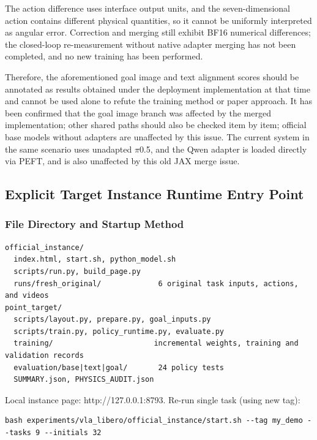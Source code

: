 The action difference uses interface output units, and the seven-dimensional action contains different physical quantities, so it cannot be uniformly interpreted as angular error. Correction and merging still exhibit BF16 numerical differences; the closed-loop re-measurement without native adapter merging has not been completed, and no new training has been performed.

Therefore, the aforementioned goal image and text alignment scores should be annotated as results obtained under the deployment implementation at that time and cannot be used alone to refute the training method or paper approach. It has been confirmed that the goal image branch was affected by the merged implementation; other shared paths should also be checked item by item; official base models without adapters are unaffected by this issue. The current system in the same scenario uses unadapted \(\pi\)0.5, and the Qwen adapter is loaded directly via PEFT, and is also unaffected by this old JAX merge issue.


\subsection{Explicit Target Instance Runtime Entry Point}\label{s14-detail-18}

\subsubsection{File Directory and Startup Method}\label{s14-detail-19}

\begin{Verbatim}[breaklines=true,breakanywhere=true,fontsize=\footnotesize]
official_instance/
  index.html, start.sh, python_model.sh
  scripts/run.py, build_page.py
  runs/fresh_original/             6 original task inputs, actions, and videos
point_target/
  scripts/layout.py, prepare.py, goal_inputs.py
  scripts/train.py, policy_runtime.py, evaluate.py
  training/                       incremental weights, training and validation records
  evaluation/base|text|goal/       24 policy tests
  SUMMARY.json, PHYSICS_AUDIT.json
\end{Verbatim}

Local instance page: http://127.0.0.1:8793. Re-run single task (using new tag):

\begin{Verbatim}[breaklines=true,breakanywhere=true,fontsize=\footnotesize]
bash experiments/vla_libero/official_instance/start.sh --tag my_demo --tasks 9 --initials 32
\end{Verbatim}

